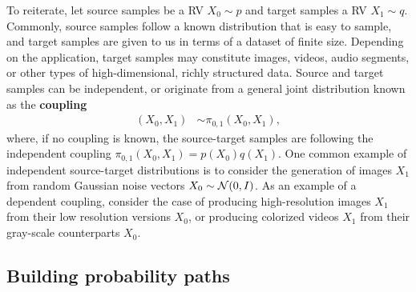 \documentclass{fairmeta}
\newcommand{\highlight}[1]{{\color{metablue} \textbf{#1}}}
\numberwithin{equation}{section}
\begin{document}
To reiterate, let source samples be a RV $X_0 \sim p$ and target samples a RV $X_1 \sim q$.
Commonly, source samples follow a known distribution that is easy to sample, and target samples are given to us in terms of a dataset of finite size.
Depending on the application, target samples may constitute images, videos, audio segments, or other types of high-dimensional, richly structured data.
Source and target samples can be independent, or originate from a general joint distribution known as the \highlight{coupling}
\begin{align}
    (X_0,X_1) &\sim \pi_{0,1} (X_0,X_1), %
\end{align}
where, if no coupling is known, the source-target samples are following the independent coupling $\pi_{0,1} (X_0,X_1) = p(X_0)q(X_1)$.
One common example of independent source-target distributions is to consider the generation of images $X_1$ from random Gaussian noise vectors $X_0\sim {\mathcal{N}}(0,I)$.
As an example of a dependent coupling, consider the case of producing high-resolution images $X_1$ from their low resolution versions $X_0$, or producing colorized videos $X_1$ from their gray-scale counterparts $X_0$. 


\subsection{Building probability paths} 
\end{document}
